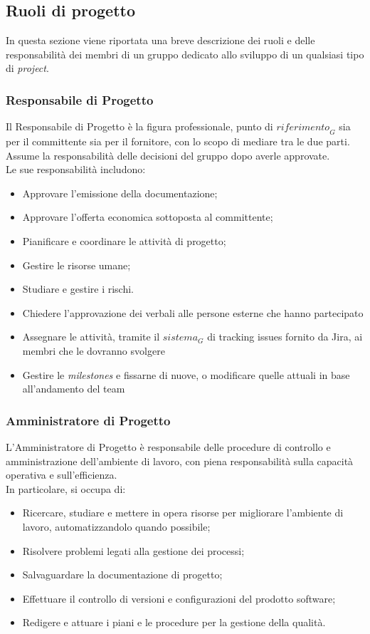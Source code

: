 \subsection{Ruoli di progetto}
In questa sezione viene riportata una breve descrizione dei ruoli e delle responsabilità dei membri di un gruppo dedicato allo sviluppo di un qualsiasi tipo di \textit{project}. 
\subsubsection{Responsabile di Progetto}
Il Responsabile di Progetto è la figura professionale, punto di $\textit{riferimento}_G$ sia per il committente sia per il fornitore, con lo scopo di
mediare tra le due parti. Assume la responsabilità delle decisioni del gruppo dopo averle approvate.\\
Le sue responsabilità includono:
\begin{itemize}
    \item Approvare l’emissione della documentazione;
    \item Approvare l’offerta economica sottoposta al committente;
    \item Pianificare e coordinare le attività di progetto;
    \item Gestire le risorse umane;
    \item Studiare e gestire i rischi.
    \item Chiedere l'approvazione dei verbali alle persone esterne che hanno partecipato
    \item Assegnare le attività, tramite il $\textit{sistema}_G$ di tracking issues fornito da Jira, ai membri che le dovranno svolgere
    \item Gestire le \textit{milestones} e fissarne di nuove, o modificare quelle attuali in base all'andamento del team
\end{itemize}
\subsubsection{Amministratore di Progetto}
L'Amministratore di Progetto è responsabile delle procedure di controllo e amministrazione dell’ambiente di
lavoro, con piena responsabilità sulla capacità operativa e sull’efficienza.\\
In particolare, si occupa di:
\begin{itemize}
    \item Ricercare, studiare e mettere in opera risorse per migliorare l’ambiente di lavoro, automatizzandolo quando possibile;
    \item Risolvere problemi legati alla gestione dei processi;
    \item Salvaguardare la documentazione di progetto;
    \item Effettuare il controllo di versioni e configurazioni del prodotto software;
    \item Redigere e attuare i piani e le procedure per la gestione della qualità.
\end{itemize}
